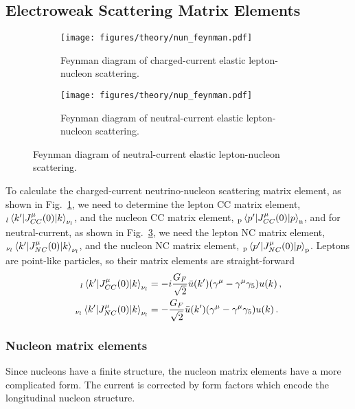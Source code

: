 \subsection{Electroweak Scattering Matrix Elements}

  \begin{figure}[h]
    \centering
    \begin{subfigure}{2.5in}
      \texttt{[image: figures/theory/nun\_feynman.pdf]}
      \caption{Feynman diagram of charged-current elastic lepton-nucleon
      scattering.}
      \label{fig:ccqefeynman}
    \end{subfigure}
    \hspace{2pt}
    \begin{subfigure}{2.5in}
      \texttt{[image: figures/theory/nup\_feynman.pdf]}
      \caption{Feynman diagram of neutral-current elastic lepton-nucleon
      scattering.}
      \label{fig:ncefeynman}
    \end{subfigure}
  \end{figure}

  To calculate the charged-current neutrino-nucleon scattering matrix element,
  as shown in Fig.~\ref{fig:ccqefeynman}, we need to determine the lepton CC
  matrix element, $_{l}\mel{k'}{J^{\mu}_{CC}(0)}{k}_{\nu_l}$, and the nucleon
  CC matrix element, $_{\textrm{p}}\mel{p'}{J^{\mu}_{CC}(0)}{p}_{\textrm{n}}$,
  and for neutral-current, as shown in Fig.~\ref{fig:ncefeynman}, we need the
  lepton NC matrix element, $_{\nu_l}\mel{k'}{J^{\mu}_{NC}(0)}{k}_{\nu_l}$, and
  the nucleon NC matrix element,
  $_{\textrm{p}}\mel{p'}{J^{\mu}_{NC}(0)}{p}_{\textrm{p}}$. Leptons are
  point-like particles, so their matrix elements are straight-forward
  \begin{equation}\label{eq:leptonmatel}
    \begin{aligned}
      _l\mel{k'}{J^{\mu}_{CC}(0)}{k}_{\nu_l}
        &= -i\frac{G_F}{\sqrt{2}}\bar{u}(k')(\gamma^{\mu} - \gamma^{\mu}\gamma_5)u(k) \,, \\
        _{\nu_l}\mel{k'}{J^{\mu}_{NC}(0)}{k}_{\nu_l}
        &= -\frac{G_F}{\sqrt{2}}\bar{u}(k')(\gamma^{\mu} - \gamma^{\mu}\gamma_5)u(k) \,.
    \end{aligned}
  \end{equation}

  \subsubsection{Nucleon matrix elements}
  Since nucleons have a finite structure, the nucleon matrix elements have a
  more complicated form. The current is corrected by form factors which encode
  the longitudinal nucleon structure.


